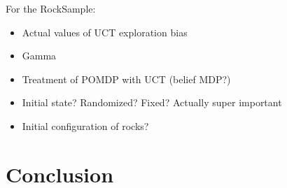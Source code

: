 \documentclass[11pt]{article} %
\begin{document}
For the RockSample:
\begin{itemize}
\item Actual values of UCT exploration bias
\item Gamma
\item Treatment of POMDP with UCT (belief MDP?)
\item Initial state? Randomized? Fixed? Actually super important
\item Initial configuration of rocks?
\end{itemize}


\section{Conclusion}




\end{document}
